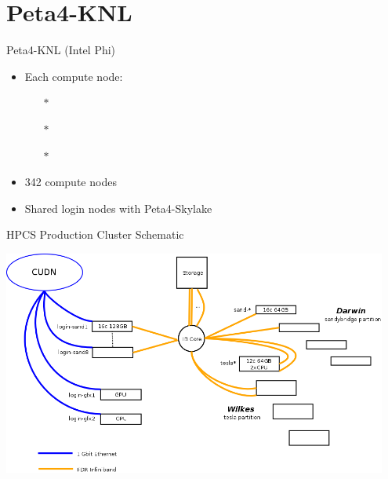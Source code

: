 \section{Peta4-KNL}
\begin{frame}{Peta4-KNL (Intel Phi)}
\begin{itemize}
\item{Each compute node:}
\begin{itemize}
\item[$\ast$]{}
\item[$\ast$]{}
\item[$\ast$]{}
\end{itemize}
\item{342 compute nodes}
\item{Shared login nodes with Peta4-Skylake}
\end{itemize}
\end{frame}


\begin{frame}{HPCS Production Cluster Schematic}
\centerline{\includegraphics[width=0.95\textwidth]{imgs/cluster.png}}%
\end{frame}

